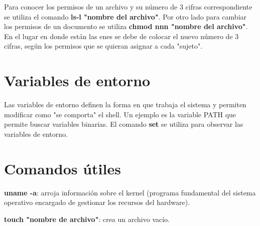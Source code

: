 \documentclass[letter paper, 12pt, oneside]{article}
\begin{document}
 
 Para conocer los permisos de un archivo y su número de 3 cifras correspondiente se utiliza el comando \textbf{ls-l  "nombre del archivo"}. Por otro lado para cambiar los permisos de un documento se utiliza \textbf{chmod nnn "nombre del archivo"}. En el lugar en donde están las enes se debe de colocar el nuevo número de 3 cifras, según los permisos que se quieran asignar a cada "sujeto".
 
 \newpage
 \section{Variables de entorno}
 
 Las variables de entorno definen la forma en que trabaja el sistema y permiten modificar como "se comporta" el shell. Un ejemplo es la variable PATH que permite buscar variables binarias. El comando \textbf{set} se utiliza para observar las variables de entorno. 
 
\section{Comandos útiles}



\textbf{uname -a}: arroja información sobre el kernel (programa fundamental del sistema operativo encargado de gestionar los recursos del hardware).

\textbf{touch "nombre de archivo"}: crea un archivo vacío.
\end{document}
